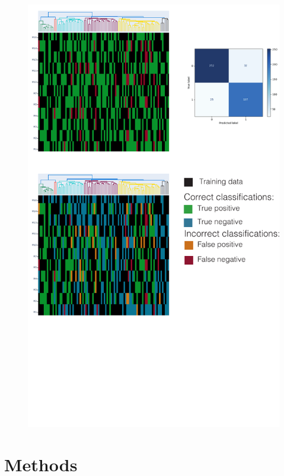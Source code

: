\documentclass[11pt,a4paper]{article}
\begin{document}
 \begin{figure}[p]
    \includegraphics[width=\textwidth]{figures/FIG_classifier_dendrogram.pdf}
    \caption{}
    \label{fig:FIG_classifier_dendrogram}
 \end{figure}


\section{Methods}
\end{document}
